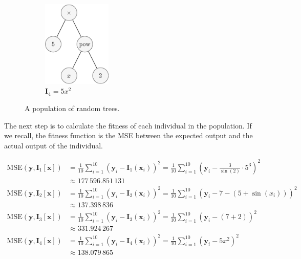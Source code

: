 \begin{figure}[ht!]
\begin{subfigure}[t]{0.4\textwidth}
      \centering
      \includegraphics[height=4.125cm]{img/theoretical_framework/GP Initial Population 4.png}
      \caption{\(\mathbf{I}_4 = 5x^2\)}
      \label{fig:bg:gp:init:population:4}
    \end{subfigure}
    \caption{A population of random trees.}
    \label{fig:bg:gp:init:population}
  \end{figure}

  The next step is to calculate the fitness of each individual in the
  population.
  If we recall, the fitness function is the MSE between the expected output and
  the actual output of the individual.

  \begin{align*}
    \mathrm{MSE}(\mathbf{y}, \mathbf{I}_1[\mathbf{x}])
      & = \frac{1}{10} \sum_{i=1}^{10} (\mathbf{y}_i - \mathbf{I}_1(\mathbf{x}_i))^2
        = \frac{1}{10} \sum_{i=1}^{10} \left(
          \mathbf{y}_i - \frac{3}{\sin(2)} \cdot 5^3\right)^2 \\
      & \approx 177\,596.851\,131  \\
    \mathrm{MSE}(\mathbf{y}, \mathbf{I}_2[\mathbf{x}])
      & = \frac{1}{10} \sum_{i=1}^{10} (\mathbf{y}_i - \mathbf{I}_2(\mathbf{x}_i))^2
        = \frac{1}{10} \sum_{i=1}^{10} \left(
          \mathbf{y}_i - 7 - (5 + \sin(x_i))\right)^2 \\
      & \approx 137.398\,836  \\
    \mathrm{MSE}(\mathbf{y}, \mathbf{I}_3[\mathbf{x}])
      & = \frac{1}{10} \sum_{i=1}^{10} (\mathbf{y}_i - \mathbf{I}_3(\mathbf{x}_i))^2
        = \frac{1}{10} \sum_{i=1}^{10} \left(
          \mathbf{y}_i - (7 + 2)\right)^2 \\
      & \approx 331.924\,267 \\
    \mathrm{MSE}(\mathbf{y}, \mathbf{I}_4[\mathbf{x}])
      & = \frac{1}{10} \sum_{i=1}^{10} (\mathbf{y}_i - \mathbf{I}_4(\mathbf{x}_i))^2
        = \frac{1}{10} \sum_{i=1}^{10} \left(
          \mathbf{y}_i - 5x^2\right)^2 \\
      & \approx 138.079\,865
  \end{align*}

